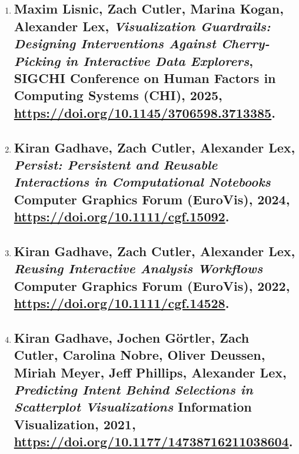 \begin{enumerate}
\item \subsection{\normalsize Maxim Lisnic, \textbf{Zach Cutler}, Marina Kogan, Alexander Lex, \textit{Visualization Guardrails: Designing Interventions Against Cherry-Picking in Interactive Data Explorers}, SIGCHI Conference on Human Factors in Computing Systems (CHI), 2025, \href{https://doi.org/10.1145/3706598.3713385}{https://doi.org/10.1145/3706598.3713385}.}
\vspace{1ex}

\item \subsection{\normalsize Kiran Gadhave, \textbf{Zach Cutler}, Alexander Lex, \textit{Persist: Persistent and Reusable Interactions in Computational Notebooks} Computer Graphics Forum (EuroVis), 2024, \href{https://doi.org/10.1111/cgf.15092}{https://doi.org/10.1111/cgf.15092}.}

\item \subsection{\normalsize Kiran Gadhave, \textbf{Zach Cutler}, Alexander Lex, \textit{Reusing Interactive Analysis Workflows} Computer Graphics Forum (EuroVis), 2022, \href{https://doi.org/10.1111/cgf.14528}{https://doi.org/10.1111/cgf.14528}.}
\vspace{1ex}

\item \subsection{\normalsize Kiran Gadhave, Jochen Görtler, \textbf{Zach Cutler}, Carolina Nobre, Oliver Deussen, Miriah Meyer, Jeff Phillips, Alexander Lex, \textit{Predicting Intent Behind Selections in Scatterplot Visualizations} Information Visualization, 2021, \href{https://doi.org/10.1177/14738716211038604}{https://doi.org/10.1177/14738716211038604}.}


\end{enumerate}
